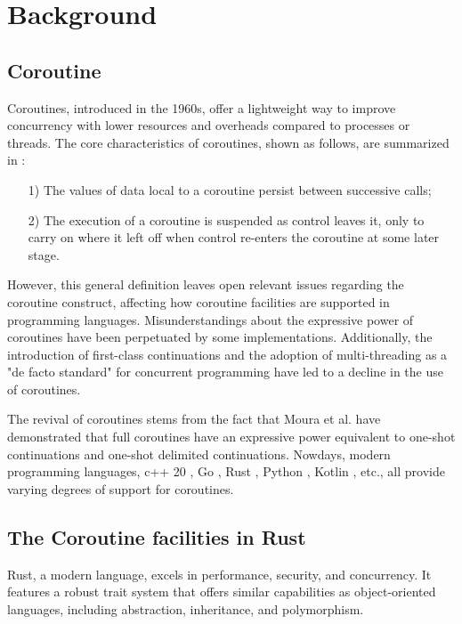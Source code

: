 \documentclass[conference]{IEEEtran}
\begin{document}
\section{Background}
\label{section: Background}

\subsection{Coroutine}

Coroutines, introduced in the 1960s, offer a lightweight way to improve concurrency with lower resources and overheads compared to processes or threads. The core characteristics of coroutines, shown as follows, are summarized in \cite{1980Coroutines}:

\begin{itemize}[leftmargin=*]
  \item[1)] The values of data local to a coroutine persist between successive calls;
  \item[2)] The execution of a coroutine is suspended as control leaves it, only to carry on where it left off when control re-enters the coroutine at some later stage.
\end{itemize}

However, this general definition leaves open relevant issues regarding the coroutine construct, affecting how coroutine facilities are supported in programming languages. Misunderstandings about the expressive power of coroutines have been perpetuated by some implementations. Additionally, the introduction of first-class continuations and the adoption of multi-threading as a "de facto standard" for concurrent programming have led to a decline in the use of coroutines.

The revival of coroutines stems from the fact that Moura et al. \cite{2009Revisiting} have demonstrated that full coroutines have an expressive power equivalent to one-shot continuations and one-shot delimited continuations. Nowdays, modern programming languages, c++ 20 \cite{C++20-coroutine}, Go \cite{goroutines}, Rust \cite{rosendahl2017green}, Python \cite{python-coroutine}, Kotlin \cite{kotlin-coroutines}, etc., all provide varying degrees of support for coroutines.

\subsection{The Coroutine facilities in Rust}
\label{subsection: rust_async}

Rust, a modern language, excels in performance, security, and concurrency. It features a robust trait system that offers similar capabilities as object-oriented languages, including abstraction, inheritance, and polymorphism.
\end{document}
